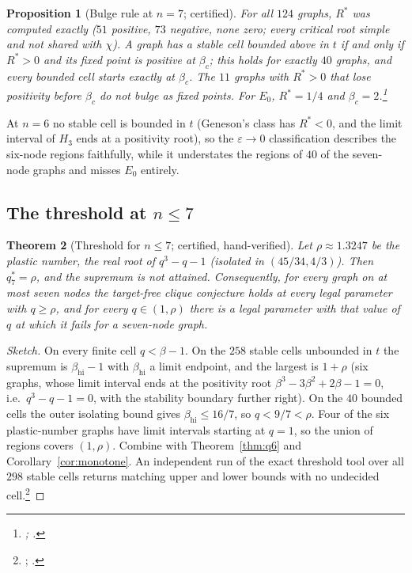 \documentclass[11pt]{article}
\newtheorem{theorem}{Theorem}[section]
\newtheorem{proposition}[theorem]{Proposition}
\theoremstyle{definition}
\newcommand{\eps}{\varepsilon}
\begin{document}
\begin{proposition}[Bulge rule at $n=7$; certified]\label{prop:bulge}
For all $124$ graphs, $R^*$ was computed exactly ($51$ positive, $73$ negative, none zero; every critical root simple and not
shared with $\chi$). A graph has a stable cell bounded above in $t$ if and only if $R^*>0$ and its fixed point is positive at
$\beta_c$; this holds for exactly $40$ graphs, and every bounded cell starts exactly at $\beta_c$. The $11$ graphs with $R^*>0$
that lose positivity before $\beta_c$ do not bulge as fixed points. For $E_0$, $R^*=1/4$ and $\beta_c=2$.\footnote{; .}
\end{proposition}

At $n=6$ no stable cell is bounded in $t$ (Geneson's class has $R^*<0$, and the limit interval of $H_3$ ends at a positivity
root), so the $\eps\to0$ classification describes the six-node regions faithfully, while it understates the regions of $40$ of
the seven-node graphs and misses $E_0$ entirely.

\subsection{The threshold at \texorpdfstring{$n\le7$}{n <= 7}}
\begin{theorem}[Threshold for $n\le7$; certified, hand-verified]\label{thm:q7}
Let $\rho\approx1.3247$ be the plastic number, the real root of $q^3-q-1$ (isolated in $(45/34,4/3)$). Then $q_7^*=\rho$, and
the supremum is not attained. Consequently, for every graph on at most seven nodes the target-free clique conjecture holds at
every legal parameter with $q\ge\rho$, and for every $q\in(1,\rho)$ there is a legal parameter with that value of $q$ at which it
fails for a seven-node graph.
\end{theorem}
\begin{proof}[Sketch]
On every finite cell $q<\beta-1$. On the $258$ stable cells unbounded in $t$ the supremum is $\beta_{\mathrm{hi}}-1$ with
$\beta_{\mathrm{hi}}$ a limit endpoint, and the largest is $1+\rho$ (six graphs, whose limit interval ends at the positivity root
$\beta^3-3\beta^2+2\beta-1=0$, i.e.\ $q^3-q-1=0$, with the stability boundary further right). On the $40$ bounded cells the outer
isolating bound gives $\beta_{\mathrm{hi}}\le16/7$, so $q<9/7<\rho$. Four of the six plastic-number graphs have limit intervals
starting at $q=1$, so the union of regions covers $(1,\rho)$. Combine with Theorem~\ref{thm:q6} and
Corollary~\ref{cor:monotone}. An independent run of the exact threshold tool over all $298$ stable cells returns matching
upper and lower bounds with no undecided cell.\footnote{; .}
\end{proof}
\end{document}
